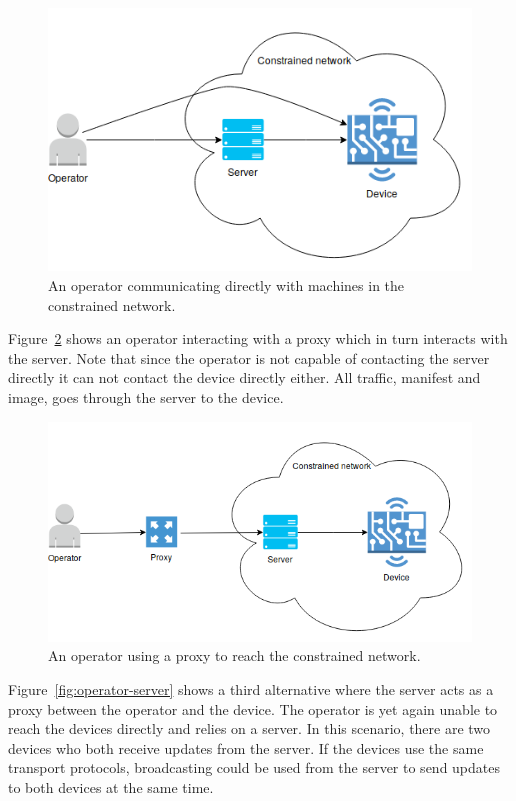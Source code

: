 \documentclass[0-thesis.tex]{subfiles}
\begin{document}
\begin{figure}
    \caption{An operator communicating directly with machines in the constrained network.}
    \label{fig:operator-direct}
    \includegraphics[scale=0.8]{images/operator-direct.png}
\end{figure}

Figure~\ref{fig:operator-proxy} shows an operator interacting with a proxy which in turn
interacts with the server. Note that since the operator is not capable of contacting the
server directly it can not contact the device directly either. All traffic, manifest and
image, goes through the server to the device. 

\begin{figure}
    \caption{An operator using a proxy to reach the constrained network.}
    \label{fig:operator-proxy}
    \includegraphics[scale=0.7]{images/operator-proxy.png}
\end{figure}

Figure~\ref{fig:operator-server} shows a third alternative where the server acts as a
proxy between the operator and the device. The operator is yet again unable to reach the
devices directly and relies on a server. In this scenario, there are two devices who both
receive updates from the server. If the devices use the same transport protocols,
broadcasting could be used from the server to send updates to both devices at the same
time.
\end{document}
